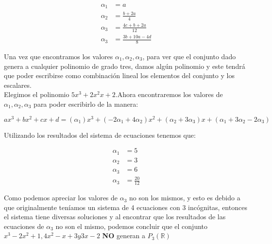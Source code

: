 \documentclass[letterpaper]{article}
\newcommand{\R}{\mathds{R}}
\renewcommand{\*}{\cdot}
\theoremstyle{definition}
\begin{document}
	\begin{center}
		\begin{align*}
		\alpha_{1}&=a\\
		\alpha_{2}&=\frac{b+2a}{4}\\
		\alpha_{3}&=\frac{4c+b+2a}{12}\\
		\alpha_{3}&=\frac{3b+10a-4d}{8}
		\end{align*}
	\end{center}

Una vez que encontramos los valores $\alpha_{1}, \alpha_{2}, \alpha_{3}$, para ver que el conjunto dado genera a cualquier polinomio de grado tres, damos algún polinomio y este tendrá que poder escribirse como combinación lineal los elementos del conjunto y los escalares.\\

Elegimos el polinomio $5x^3+2x^2x+2$.Ahora encontraremos los valores de $\alpha_{1}, \alpha_{2}, \alpha_{3}$ para poder escribirlo de la manera:
\begin{center}
	$ax^3+bx^2+cx+d = (\alpha_{1})x^3 + (-2\alpha_{1}+4\alpha_{2})x^2 + (\alpha_{2}+3\alpha_{3})x + (\alpha_{1}+3\alpha_{2}-2\alpha_{3})$
\end{center} 
Utilizando los resultados del sistema de ecuaciones tenemos que:

		\begin{align*}
		\alpha_{1}&=5\\
		\alpha_{2}&=3\\
		\alpha_{3}&=6\\
		\alpha_{3}&=\frac{20}{12}
		\end{align*}
		
Como podemos apreciar los valores de $\alpha_{3}$ no son los mismos, y esto es debido a que originalmente teníamos un sistema de 4 ecuaciones con 3 incógnitas, entonces el sistema tiene diversas soluciones y al encontrar que los resultados de las ecuaciones de $\alpha_{3}$ no son el mismo, podemos concluir que el conjunto $x^3-2x^2+1,4x^2-x+3 y 3x-2$  \textbf{NO} generan a $P_{3}(\R)$
\end{document}
